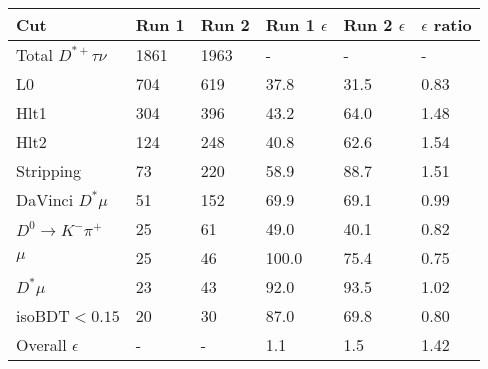 \begin{tabular}{llllll}
\toprule
 Cut                       & Run 1   & Run 2   & Run 1 $\epsilon$   & Run 2 $\epsilon$   & $\epsilon$ ratio   \\
\midrule
 Total $D^{*+}\tau\nu$     & 1861    & 1963    & -                  & -                  & -                  \\
 L0                        & 704     & 619     & 37.8               & 31.5               & 0.83               \\
 Hlt1                      & 304     & 396     & 43.2               & 64.0               & 1.48               \\
 Hlt2                      & 124     & 248     & 40.8               & 62.6               & 1.54               \\
 Stripping                 & 73      & 220     & 58.9               & 88.7               & 1.51               \\
 DaVinci $D^* \mu$         & 51      & 152     & 69.9               & 69.1               & 0.99               \\
 $D^0\rightarrow K^-\pi^+$ & 25      & 61      & 49.0               & 40.1               & 0.82               \\
 $\mu$                     & 25      & 46      & 100.0              & 75.4               & 0.75               \\
 $D^* \mu$                 & 23      & 43      & 92.0               & 93.5               & 1.02               \\
 isoBDT$ < 0.15$           & 20      & 30      & 87.0               & 69.8               & 0.80               \\
 Overall $\epsilon$        & -       & -       & 1.1                & 1.5                & 1.42               \\
\bottomrule
\end{tabular}
